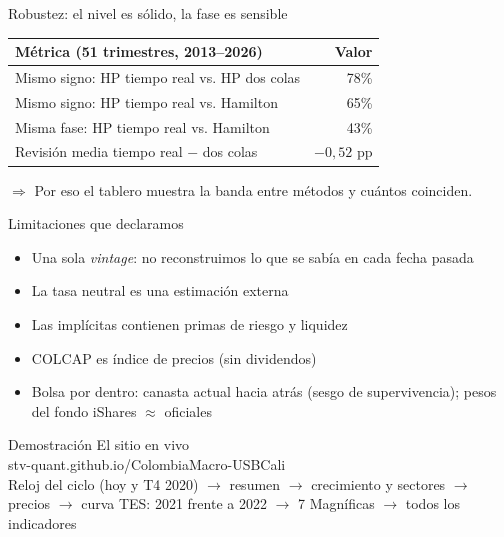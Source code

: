 \documentclass[aspectratio=169,11pt]{beamer}
\begin{document}
\begin{frame}{Robustez: el nivel es sólido, la fase es sensible}
\begin{center}
\begin{tabular}{@{}lr@{}}
\toprule
\textbf{Métrica} (51 trimestres, 2013–2026) & \textbf{Valor}\\\midrule
Mismo signo: HP tiempo real vs. HP dos colas & 78\%\\
Mismo signo: HP tiempo real vs. Hamilton & 65\%\\
Misma fase: HP tiempo real vs. Hamilton & 43\%\\
Revisión media tiempo real $-$ dos colas & $-0{,}52$ pp\\
\bottomrule
\end{tabular}
\end{center}
\vspace{0.6em}
$\Rightarrow$ Por eso el tablero muestra la \alert{banda} entre métodos y cuántos coinciden.
\end{frame}

\begin{frame}{Limitaciones que declaramos}
\begin{itemize}
\item Una sola \emph{vintage}: no reconstruimos lo que se sabía en cada fecha pasada
\item La tasa neutral es una estimación externa
\item Las implícitas contienen primas de riesgo y liquidez
\item COLCAP es índice de precios (sin dividendos)
\item Bolsa por dentro: canasta actual hacia atrás (sesgo de supervivencia); pesos del fondo iShares $\approx$ oficiales
\end{itemize}
\end{frame}

\begin{frame}[c]{Demostración}
\centering
{\Large El sitio en vivo}\\[1em]
{\color{cmblue}\large stv-quant.github.io/ColombiaMacro-USBCali}\\[1.2em]
\small Reloj del ciclo (hoy y T4 2020) $\rightarrow$ resumen $\rightarrow$ crecimiento y sectores $\rightarrow$ precios $\rightarrow$ \alert{curva TES: 2021 frente a 2022} $\rightarrow$ 7 Magníficas $\rightarrow$ todos los indicadores
\end{frame}
\end{document}
